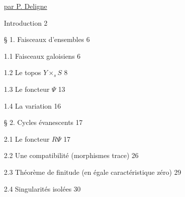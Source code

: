 \underline{par  P. Deligne}

Introduction \hfill 2

\S{} 1.  Faisceaux d'ensembles \hfill 6

1.1  Faisceaux galoisiens \hfill 6

1.2  Le topos $Y \times_s S$ \hfill 8

1.3  Le foncteur $\Psi$ \hfill 13

1.4  La variation \hfill 16

\S{} 2.  Cycles évanescents \hfill 17

2.1  Le foncteur $R\Psi$ \hfill 17

2.2  Une compatibilité (morphismes trace) \hfill 26

2.3  Théorème de finitude (en égale caractéristique zéro) \hfill 29

2.4  Singularités isolées \hfill 30
